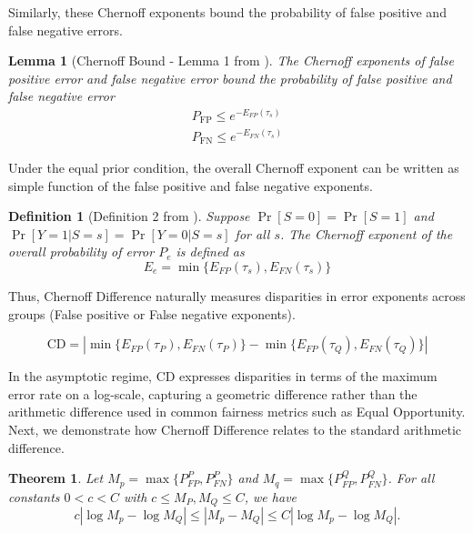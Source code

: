 \documentclass[11pt,letterpaper]{article}
\newtheorem{theorem}{Theorem}
\newtheorem{lemma}{Lemma}
\newtheorem{definition}{Definition}
\begin{document}
Similarly, these Chernoff exponents bound the probability of false positive and false negative errors.


\begin{lemma}
    [Chernoff Bound - Lemma 1 from \citet{dutta2020there}] 
    The Chernoff exponents of false positive error and false negative error bound the probability of false positive and false negative error
    \begin{align}
        P_\text{FP} \leq e^{-E_{FP}(\tau_s)}\\
        P_\text{FN} \leq e^{-E_{FN}(\tau_s)}
    \end{align}
\end{lemma}


Under the equal prior condition, the overall Chernoff exponent can be written as simple function of the false positive and false negative exponents.
\begin{definition}
    [Definition 2 from \citet{dutta2020there}] Suppose $\Pr[S = 0] = \Pr[S=1]$ and $\Pr[Y=1|S =s] = \Pr[Y=0|S=s]$ for all $s$. The Chernoff exponent of the overall probability of error $P_e$ is defined as
    \begin{equation}
        E_e = \min\{E_{FP}(\tau_s), E_{FN}(\tau_s)\}
    \end{equation}
\end{definition}



Thus, Chernoff Difference naturally measures disparities in error exponents across groups (False positive or False negative exponents). 

\begin{equation}
\text{CD} = |\min\{E_{FP}(\tau_P), E_{FN}(\tau_P)\} - \min\{E_{FP}(\tau_Q), E_{FN}(\tau_Q)\}|    
\end{equation}

In the asymptotic regime, CD expresses disparities in terms of the maximum error rate on a log-scale, capturing a geometric difference rather than the arithmetic difference used in common fairness metrics such as Equal Opportunity. Next, we demonstrate how Chernoff Difference relates to the standard arithmetic difference.

\begin{theorem} \label{thm:lipschitz}
    Let $M_p = \max\{P_{FP}^P, P_{FN}^P\}$ and $M_q = \max\{P_{FP}^Q, P_{FN}^Q\}$. For all constants $0< c < C$ with $c \leq M_P, M_Q \leq C$, we have
    \begin{equation}
        c\left|\log M_p - 
    \log M_Q\right| \leq \left|M_p - M_Q\right|\leq C\left|\log M_p - 
    \log M_Q\right|.
    \end{equation}
\end{theorem}
\end{document}
